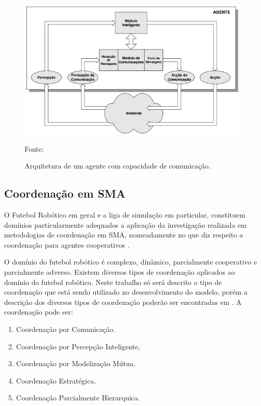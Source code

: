 \begin{figure}[!htb]
\centering
\includegraphics[scale=0.7]{figuras/arquiteturaComm.png}
\caption{Arquitetura de um agente com capacidade de comunicação.} Fonte: \cite{reisTese} \label{fig:arqComm}
\end{figure}
\FloatBarrier

\subsection{Coordenação em SMA}
\label{subsec:coosma}
O Futebol Robótico em geral e a liga de simulação em particular, constituem domínios particularmente adequados a aplicação da 
investigação realizada em metodologias de coordenação em SMA, nomeadamente no que diz respeito a coordenação
para agentes cooperativos \cite{reisTese}.

O domínio do futebol robótico é complexo, dinâmico, parcialmente cooperativo e parcialmente adverso. Existem diversos
tipos de coordenação aplicados ao domínio do futebol robótico. Neste trabalho só será descrito o tipo de coordenação que está sendo 
utilizado no desenvolvimento do modelo, porém a descrição dos diversos tipos de coordenação poderão ser encontradas 
em . A coordenação pode ser:

\begin{enumerate}
\item Coordenação por Comunicação.
\item Coordenação por Percepção Inteligente,
\item Coordenação por Modelização Mútua.
\item Coordenação Estratégica.
\item Coordenação Parcialmente Hierarquica.
\end{enumerate}

